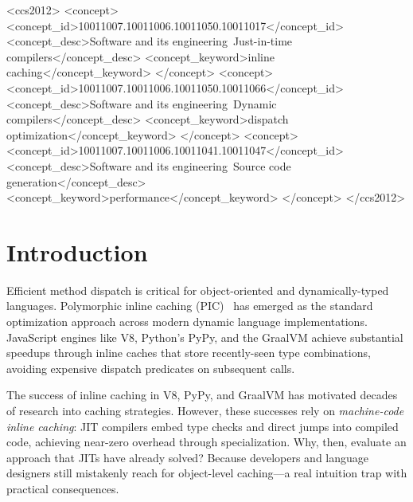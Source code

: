 \documentclass[sigplan,final,acmsmall,review,screen]{acmart}
\begin{document}
\begin{CCSXML}
<ccs2012>
<concept>
<concept_id>10011007.10011006.10011050.10011017</concept_id>
<concept_desc>Software and its engineering~Just-in-time compilers</concept_desc>
<concept_keyword>inline caching</concept_keyword>
</concept>
<concept>
<concept_id>10011007.10011006.10011050.10011066</concept_id>
<concept_desc>Software and its engineering~Dynamic compilers</concept_desc>
<concept_keyword>dispatch optimization</concept_keyword>
</concept>
<concept>
<concept_id>10011007.10011006.10011041.10011047</concept_id>
<concept_desc>Software and its engineering~Source code generation</concept_desc>
<concept_keyword>performance</concept_keyword>
</concept>
</ccs2012>
\end{CCSXML}



\maketitle

\section{Introduction}

Efficient method dispatch is critical for object-oriented and dynamically-typed languages.
Polymorphic inline caching (PIC)~\cite{hoelzle1991optimizing} has emerged as the standard
optimization approach across modern dynamic language implementations. JavaScript engines like V8,
Python's PyPy, and the GraalVM achieve substantial speedups through inline caches that store
recently-seen type combinations, avoiding expensive dispatch predicates on subsequent calls.

The success of inline caching in V8, PyPy, and GraalVM has motivated decades of research into caching strategies. However, these
successes rely on \emph{machine-code inline caching}: JIT compilers embed type checks and direct jumps into compiled code, achieving near-zero overhead through specialization. Why, then, evaluate an approach that JITs have already solved? Because developers and language designers still mistakenly reach for object-level caching—a real intuition trap with practical consequences.
\end{document}
